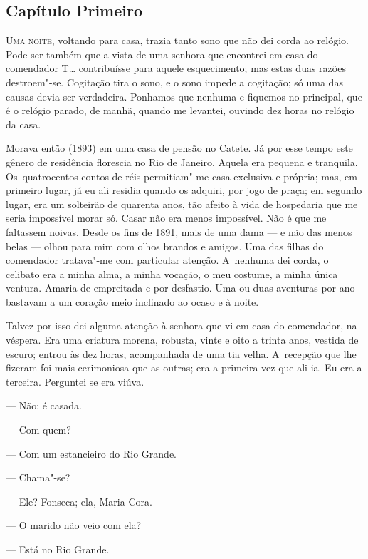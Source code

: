 \begin{linenumbers}

\section{Capítulo Primeiro}

\noindent{}\textsc{Uma noite}, voltando para casa, trazia tanto sono que não dei corda ao
relógio. Pode ser também que a vista de uma senhora que encontrei em
casa do comendador T\ldots{} contribuísse para aquele esquecimento; mas estas
duas razões destroem"-se. Cogitação tira o sono, e o sono impede a
cogitação; só uma das causas devia ser verdadeira. Ponhamos que nenhuma
e fiquemos no principal, que é o relógio parado, de manhã, quando me
levantei, ouvindo dez horas no relógio da casa.

Morava então (1893) em uma casa de pensão no Catete. Já por esse tempo
este gênero de residência florescia no Rio de Janeiro. Aquela era
pequena e tranquila. Os~quatrocentos contos de réis permitiam"-me casa
exclusiva e própria; mas, em primeiro lugar, já eu ali residia quando os
adquiri, por jogo de praça; em segundo lugar, era um solteirão de
quarenta anos, tão afeito à vida de hospedaria que me seria impossível
morar só. Casar não era menos impossível. Não é que me faltassem noivas.
Desde os fins de 1891, mais de uma dama --- e não das menos belas ---
olhou para mim com olhos brandos e amigos. Uma das filhas do comendador
tratava"-me com particular atenção. A~nenhuma dei corda, o celibato era a
minha alma, a minha vocação, o meu costume, a minha única ventura.
Amaria de empreitada e por desfastio. Uma ou duas aventuras por ano
bastavam a um coração meio inclinado ao ocaso e à noite.

Talvez por isso dei alguma atenção à senhora que vi em casa do
comendador, na véspera. Era uma criatura morena, robusta, vinte e oito a
trinta anos, vestida de escuro; entrou às dez horas, acompanhada de uma
tia velha. A~recepção que lhe fizeram foi mais cerimoniosa que as
outras; era a primeira vez que ali ia. Eu era a terceira. Perguntei se
era viúva.

--- Não; é casada.

--- Com quem?

--- Com um estancieiro do Rio Grande.

--- Chama"-se?

--- Ele? Fonseca; ela, Maria Cora.

--- O marido não veio com ela?

--- Está no Rio Grande.


\end{linenumbers}
